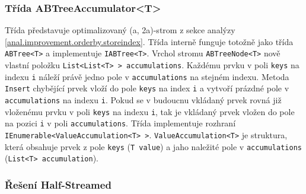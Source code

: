 \subsubsection{Třída ABTreeAccumulator<T>}

Třída představuje optimalizovaný (a, 2a)-strom z sekce analýzy \ref{anal.improvement.orderby.storeindex}.
Třída interně funguje totožně jako třída \texttt{ABTree<T>} a implementuje \texttt{IABTree<T>}.
Vrchol stromu \texttt{ABTreeNode<T>} nově vlastní položku \texttt{List<List<T> > accumulations}.
Každému prvku v poli \texttt{keys} na indexu \texttt{i} náleží právě jedno pole v \texttt{accumulations} na stejném indexu.
Metoda \texttt{Insert} chybějící prvek vloží do pole \texttt{keys} na index \texttt{i} a vytvoří prázdné pole v \texttt{accumulations} na indexu \texttt{i}.
Pokud se v budoucnu vkládaný prvek rovná již vloženému prvku v poli \texttt{keys} na indexu \texttt{i}, tak je vkládaný prvek vložen do pole na pozici \texttt{i} v poli \texttt{accumulations}.
Třída implementuje rozhraní \texttt{IEnumerable<ValueAccumulation<T> >}.
\texttt{ValueAccumulation<T>} je struktura, která obsahuje prvek z pole \texttt{keys} (\texttt{T value}) a jaho naležité pole v \texttt{accumulations} (\texttt{List<T> accumulation}).

\subsubsection{Řešení Half-Streamed}

